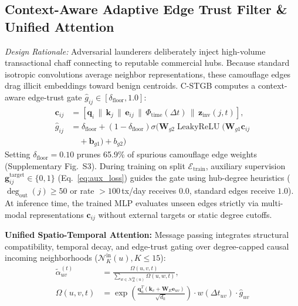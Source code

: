 \subsection{Context-Aware Adaptive Edge Trust Filter \& Unified Attention}
\label{sec:edge_trust_filter}
\textit{Design Rationale:} Adversarial launderers deliberately inject high-volume transactional chaff connecting to reputable commercial hubs. Because standard isotropic convolutions average neighbor representations, these camouflage edges drag illicit embeddings toward benign centroids. C-STGB computes a context-aware edge-trust gate $\hat{g}_{ij} \in [\delta_{\text{floor}}, 1.0]$:
\begin{align}
\mathbf{c}_{ij} &= \left[ \mathbf{q}_i \,\|\, \mathbf{k}_j \,\|\, \mathbf{e}_{ij} \,\|\, \Phi_{\text{time}}(\Delta t) \,\|\, \mathbf{z}_{\text{inv}}(j, t) \right], \label{eq:edge_trust_gate} \\
\hat{g}_{ij} &= \delta_{\text{floor}} + (1 - \delta_{\text{floor}}) \sigma\Big( \mathbf{W}_{g2} \operatorname{LeakyReLU}\big( \mathbf{W}_{g1} \mathbf{c}_{ij} \nonumber \\
&\quad + \mathbf{b}_{g1} \big) + b_{g2} \Big)
\end{align}
Setting $\delta_{\text{floor}} = 0.10$ prunes 65.9\% of spurious camouflage edge weights (Supplementary Fig.~S3). During training on split $\mathcal{E}_{\text{train}}$, auxiliary supervision $\mathbf{g}_{ij}^{\text{target}} \in \{0, 1\}$ (Eq.~\ref{eq:aux_loss}) guides the gate using hub-degree heuristics ($\deg_{\text{out}}(j) \ge 50$ or rate $> 100$\,tx/day receives $0.0$, standard edges receive $1.0$). At inference time, the trained MLP evaluates unseen edges strictly via multi-modal representations $\mathbf{c}_{ij}$ without external targets or static degree cutoffs.

\textbf{Unified Spatio-Temporal Attention:} Message passing integrates structural compatibility, temporal decay, and edge-trust gating over degree-capped causal incoming neighborhoods ($\mathcal{N}_K^{\text{in}}(u), K \le 15$):
\begin{align}
\tilde{\alpha}_{uv}^{(t)} &= \frac{\Omega(u, v, t)}{\sum_{w \in \mathcal{N}_K^{\text{in}}(u)} \Omega(u, w, t)}, \\
\Omega(u, v, t) &= \exp\left(\frac{\mathbf{q}_u^T (\mathbf{k}_v + \mathbf{W}_E \mathbf{e}_{uv})}{\sqrt{d_k}}\right) \cdot w(\Delta t_{uv}) \cdot \hat{g}_{uv}
\end{align}

